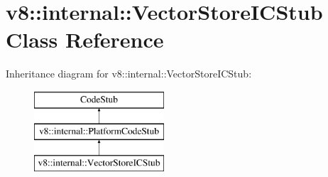 \hypertarget{classv8_1_1internal_1_1_vector_store_i_c_stub}{}\section{v8\+:\+:internal\+:\+:Vector\+Store\+I\+C\+Stub Class Reference}
\label{classv8_1_1internal_1_1_vector_store_i_c_stub}
Inheritance diagram for v8\+:\+:internal\+:\+:Vector\+Store\+I\+C\+Stub\+:\begin{figure}[H]
\begin{center}
\leavevmode
\includegraphics[height=3.000000cm]{classv8_1_1internal_1_1_vector_store_i_c_stub}
\end{center}
\end{figure}
